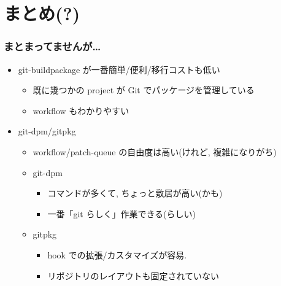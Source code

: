 \documentclass[10pt,final,c,dvipdfmx,cjk,colorlinks=false]{beamer}
\begin{document}
\section{まとめ(?)}
\label{sec-6}
\begin{frame}
\frametitle{まとまってませんが\ldots{}}
\label{sec-6-1}


\begin{itemize}
\item git-buildpackage が一番簡単/便利/移行コストも低い
\begin{itemize}
\item 既に幾つかの project が Git でパッケージを管理している
\item workflow もわかりやすい
\end{itemize}
\item git-dpm/gitpkg
\begin{itemize}
\item workflow/patch-queue の自由度は高い(けれど, 複雑になりがち)
\item git-dpm
\begin{itemize}
\item コマンドが多くて, ちょっと敷居が高い(かも)
\item 一番「git らしく」作業できる(らしい)
\end{itemize}
\item gitpkg
\begin{itemize}
\item hook での拡張/カスタマイズが容易.
\item リポジトリのレイアウトも固定されていない
\end{itemize}
\end{itemize}
\end{itemize}
\end{frame}
\end{document}
